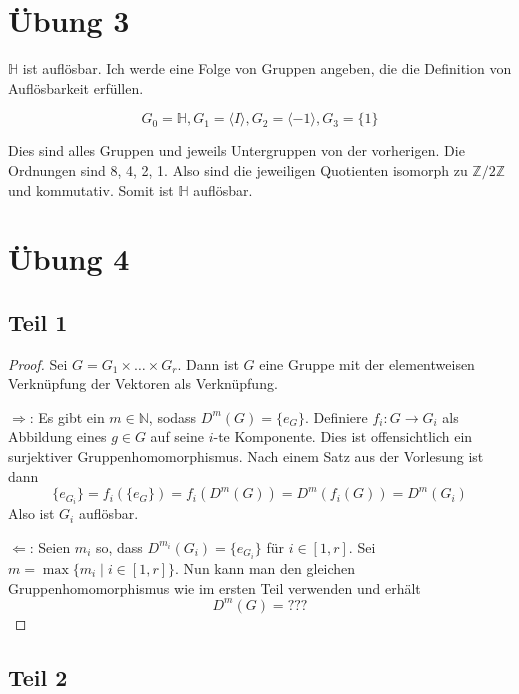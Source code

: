 \documentclass[10pt,a4paper]{article}
\begin{document}
\section{Übung 3}

$\mathbb{H}$ ist auflösbar.
Ich werde eine Folge von Gruppen angeben, die die Definition von Auflösbarkeit erfüllen.

\begin{equation}
  G_{0} = \mathbb{H}, G_{1} = \langle I \rangle, G_{2} = \langle -1 \rangle, G_{3} = \{ 1 \}
\end{equation}

Dies sind alles Gruppen und jeweils Untergruppen von der vorherigen.
Die Ordnungen sind 8, 4, 2, 1.
Also sind die jeweiligen Quotienten isomorph zu $\mathbb{Z} / 2 \mathbb{Z}$ und kommutativ.
Somit ist $\mathbb{H}$ auflösbar.

\section{Übung 4}

\subsection{Teil 1}

\begin{proof}
  Sei $G = G_{1} \times \dots \times G_{r}$.
  Dann ist $G$ eine Gruppe mit der elementweisen Verknüpfung der Vektoren als Verknüpfung.

  $\Rightarrow$: Es gibt ein $m \in \mathbb{N}$, sodass $D^{m}(G) = \{ e_{G} \}$.
  Definiere $f_{i} : G \rightarrow G_{i}$ als Abbildung eines $g \in G$ auf seine $i$-te Komponente.
  Dies ist offensichtlich ein surjektiver Gruppenhomomorphismus.
  Nach einem Satz aus der Vorlesung ist dann
  \begin{equation}
    \{ e_{G_{i}} \} = f_{i}(\{ e_{G} \}) = f_{i}(D^{m}(G)) = D^{m}(f_{i}(G)) = D^{m}(G_{i})
  \end{equation}
  Also ist $G_{i}$ auflösbar.

  $\Leftarrow$: Seien $m_{i}$ so, dass $D^{m_{i}}(G_{i}) = \{ e_{G_{i}} \}$ für $i \in [1, r]$.
  Sei $m = \max \{ m_{i} \mid i \in [1, r] \}$.
  Nun kann man den gleichen Gruppenhomomorphismus wie im ersten Teil verwenden und erhält
  \begin{equation}
    D^{m}(G) = ???
  \end{equation}
\end{proof}

\subsection{Teil 2}
\end{document}
